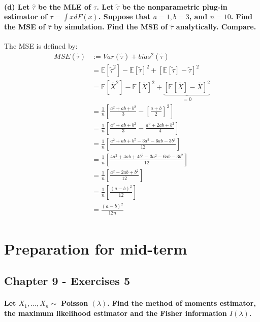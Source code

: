 \documentclass{article}
\newcommand{\E}{\mathbb{E}}
\begin{document}
\paragraph{(d) Let $\hat{\tau}$ be the MLE of $\tau$. Let $\widetilde{\tau}$ be the nonparametric plug-in estimator of $\tau=\int x d F(x)$. Suppose that $a=1, b=3$, and $n=10$. Find the MSE of $\hat{\tau}$ by simulation. Find the MSE of $\widetilde{\tau}$ analytically. Compare.\\}
The MSE is defined by:
\begin{align*}
    MSE (\tilde \tau)
     & := Var(\tilde\tau)   + bias^2 (\tilde \tau)                                          \\
     & = \E[\tilde\tau^2] - \E[\tilde\tau]^2 + \left[\E[\tilde\tau] - \tilde\tau\right]^2   \\
     & = \E[\bar X^2] - \E[\bar X]^2 + \underbrace{\left[\E[\bar X] - \bar X\right]^2}_{=0} \\
     & = \frac{1}{n}\left[\frac{a^2 + ab + b^2}{3} - \left[\frac{a+b}{2}\right]^2\right]    \\
     & = \frac{1}{n}\left[\frac{a^2 + ab + b^2}{3} - \frac{a^2 + 2ab + b^2}{4}\right]       \\
     & = \frac{1}{n}\left[\frac{a^2 + ab + b^2 - 3a^2 - 6ab - 3b^2}{12}\right]              \\
     & = \frac{1}{n}\left[\frac{4a^2 + 4ab + 4b^2 - 3a^2 - 6ab - 3b^2}{12}\right]           \\
     & = \frac{1}{n}\left[\frac{a^2 -2ab + b^2}{12}\right]                                  \\
     & = \frac{1}{n}\left[\frac{(a-b)^2}{12}\right]                                         \\
     & = \frac{(a-b)^2}{12n}                                                                \\
\end{align*}

\section{Preparation for mid-term}
\subsection{Chapter 9 - Exercises 5}

\paragraph{Let $X_{1}, \ldots, X_{n} \sim$ Poisson $(\lambda)$. Find the method of moments estimator, the maximum likelihood estimator and the Fisher information $I(\lambda)$.}
\end{document}
